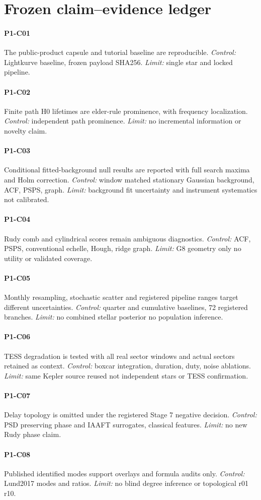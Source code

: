 \section*{Frozen claim--evidence ledger}
\paragraph{P1-C01} The public-product capsule and tutorial baseline are reproducible.
\textit{Control:} Lightkurve baseline, frozen payload SHA256. \textit{Limit:} single star and locked pipeline.
\paragraph{P1-C02} Finite path H0 lifetimes are elder-rule prominence, with frequency localization.
\textit{Control:} independent path prominence. \textit{Limit:} no incremental information or novelty claim.
\paragraph{P1-C03} Conditional fitted-background null results are reported with full search maxima and Holm correction.
\textit{Control:} window matched stationary Gaussian background, ACF, PSPS, graph. \textit{Limit:} background fit uncertainty and instrument systematics not calibrated.
\paragraph{P1-C04} Rudy comb and cylindrical scores remain ambiguous diagnostics.
\textit{Control:} ACF, PSPS, conventional echelle, Hough, ridge graph. \textit{Limit:} G8 geometry only no utility or validated coverage.
\paragraph{P1-C05} Monthly resampling, stochastic scatter and registered pipeline ranges target different uncertainties.
\textit{Control:} quarter and cumulative baselines, 72 registered branches. \textit{Limit:} no combined stellar posterior no population inference.
\paragraph{P1-C06} TESS degradation is tested with all real sector windows and actual sectors retained as context.
\textit{Control:} boxcar integration, duration, duty, noise ablations. \textit{Limit:} same Kepler source reused not independent stars or TESS confirmation.
\paragraph{P1-C07} Delay topology is omitted under the registered Stage 7 negative decision.
\textit{Control:} PSD preserving phase and IAAFT surrogates, classical features. \textit{Limit:} no new Rudy phase claim.
\paragraph{P1-C08} Published identified modes support overlays and formula audits only.
\textit{Control:} Lund2017 modes and ratios. \textit{Limit:} no blind degree inference or topological r01 r10.
